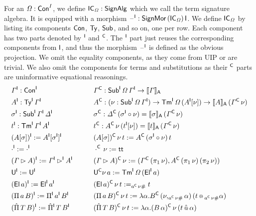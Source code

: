 \documentclass[a4paper,UKenglish,cleveref, autoref]{lipics-v2019}
\begin{document}
\begin{definition}
  For an $\mathit{\Omega}:\mathsf{Con}^I$, we define $\mathsf{IC}_{\mathit{\Omega}}:\mathsf{SignAlg}$ which we
  call the term signature algebra. It is equipped with a morphism
  $\mathord{\hspace{1pt}\text{--}\hspace{1pt}}^{\mathsf{I}} : \mathsf{SignMor}\,(\mathsf{IC}_{\mathit{\Omega}})\,\mathsf{I}$. We define $\mathsf{IC}_{\mathit{\Omega}}$
  by listing its components $\mathsf{Con}$, $\mathsf{Ty}$, $\mathsf{Sub}$, and so on, one per
  row. Each component has two parts denoted by $^{\mathsf{I}}$ and $^{\mathsf{C}}$. The
  $^{\mathsf{I}}$ part just reuses the corresponding components from $\mathsf{I}$, and
  thus the morphism $\mathord{\hspace{1pt}\text{--}\hspace{1pt}}^{\mathsf{I}}$ is defined as the obvious
  projection. We omit the equality components, as they come from UIP
  or are trivial. We also omit the components for terms and
  substitutions as their $^{\mathsf{C}}$ parts are uninformative equational
  reasonings.
  \begin{alignat*}{10}
    & \GG^\I:\Con^\I && \hspace{1em} && \GG^\C: \Sub^\I\,\GO\,\GG^\I\ra \ll\GG\rr_\A \\
    & A^\I:\Ty^\I\,\GG^\I && && A^\C:(\nu:\Sub^\I\,\GO\,\GG^\I)\ra\Tm^\I\,\GO\,(A^\I[\nu])\ra \ll A\rr_\A\,(\GG^\C\,\nu) \\
    & \sigma^\I:\Sub^\I\,\GG^\I\,\GD^\I && && \sigma^\C:\GD^\C\,(\sigma^\I\circ\nu)=\ll\sigma\rr_\A\,(\GG^\C\,\nu) \\
    & t^\I:\Tm^\I\,\GG^\I\,A^\I && && t^\C : A^\C\,\nu\,(t^\I[\nu])= \ll t\rr_\A\,(\GG^\C\,\nu) \\
    & (A[\sigma])^\I := A^\I[\sigma^\I]^\I && && (A[\sigma])^\C\,\nu\,t := A^\C\,(\sigma^\I\circ\nu)\,t \\
    & \cdot^\I := \cdot^\I && && \cdot^\C\,\nu := \tt \\
    & (\GG\rhd A)^\I := \GG^\I\rhd^\I A^\I && && (\GG\rhd A)^\C\,\nu := (\GG^\C\,(\pi_1\,\nu), A^\C\,(\pi_1\,\nu)\,(\pi_2\,\nu)) \\
    & \U^\I := \U^\I && && \U^\C\nu\,a := \Tm^\I\,\GO\,(\El^\I\,a) \\
    & (\El\,a)^\I := \El^\I\,a^\I && && (\El\,a)^\C\,\nu\,t := _{a^\C\,\nu\#}t \\
    & (\Pi\,a\,B)^\I := \Pi^\I\,a^\I\,B^\I && && (\Pi\,a\,B)^\C\,\nu\,t := \lambda\alpha.B^\C\,(\nu, _{a^\C\,\nu\#}\alpha)\,(t\oldapp {_{a^\C\,\nu\#}\alpha}) \\
    & (\Pim\,T\,B)^\I := \Pim^\I\,T\,B^\I && && (\Pim\,T\,B)^\C\,\nu\,t := \lambda\alpha.(B\,\alpha)^\C\,\nu\,(t\appm\alpha)
  \end{alignat*}
\end{definition}
\end{document}
